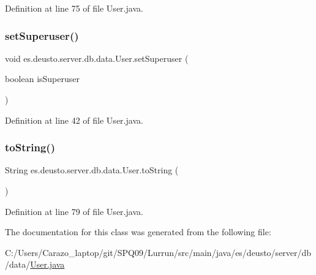 Definition at line 75 of file User.\+java.

\mbox{\label{classes_1_1deusto_1_1server_1_1db_1_1data_1_1_user_a386c51067e68570828d9dcd130e6fe74}} 
\subsubsection{\texorpdfstring{set\+Superuser()}{setSuperuser()}}
{\footnotesize\ttfamily void es.\+deusto.\+server.\+db.\+data.\+User.\+set\+Superuser (\begin{DoxyParamCaption}\item[{boolean}]{is\+Superuser }\end{DoxyParamCaption})}



Definition at line 42 of file User.\+java.

\mbox{\label{classes_1_1deusto_1_1server_1_1db_1_1data_1_1_user_a494980951c4c71c0a793994b7bcd5101}} 
\subsubsection{\texorpdfstring{to\+String()}{toString()}}
{\footnotesize\ttfamily String es.\+deusto.\+server.\+db.\+data.\+User.\+to\+String (\begin{DoxyParamCaption}{ }\end{DoxyParamCaption})}



Definition at line 79 of file User.\+java.



The documentation for this class was generated from the following file\+:\begin{DoxyCompactItemize}
\item 
C\+:/\+Users/\+Carazo\+\_\+laptop/git/\+S\+P\+Q09/\+Lurrun/src/main/java/es/deusto/server/db/data/\hyperlink{_user_8java}{User.\+java}\end{DoxyCompactItemize}

